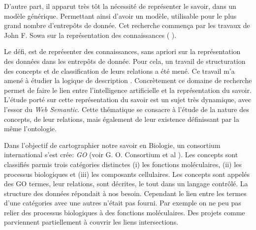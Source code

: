 \begin{refsection}

D'autre part, il apparut très tôt la nécessité de représenter le savoir, dans un modèle générique. Permettant ainsi d'avoir un modèle, utilisable pour le plus grand nombre d'entrepôts de donnée. Cet recherche  commença par les travaux de John F. Sowa sur la représentation des connaissances ( \citeyear{sowa92,sowa99}).

Le défi, est de représenter des connaissances, sans apriori sur la représentation des données dans les entrepôts de donnée. Pour cela, un travail de structuration des concepts et de classification de leurs relations a été mené. Ce travail m'a amené à étudier la logique de description \cite{baader2003description}. Concrètement ce domaine de recherche permet de faire le lien entre l'intelligence artificielle et la représentation du savoir. L'étude porté sur cette représentation du savoir est un sujet très dynamique, avec l'essor du \textit{Web Semantic}. Cette thématique se consacre à l'étude de la nature des concepts, de leur relations, mais également de leur existence définissant par la même l'ontologie.

Dans l'objectif de cartographier notre savoir en Biologie, un consortium international s'est crée: \textit{\gls{GO}} (voir G. O. Consortium
et al \citeyear{go2001,go2004}). Les concepts sont classifiés parmis trois catégories distinctes (i) les fonctions moléculaires, (ii) les processus biologiques et (iii) les composants cellulaires. Les concepts sont appelés des GO termes, leur relations, sont décrites, le tout dans un langage contrôlé. La structure des données répondait à nos besoin. Cependant le lien entre les termes d'une catégories avec une autres n'était pas fourni. Par exemple on ne peu pas relier des processus biologiques à des fonctions moléculaires. Des projets comme \cite{AdditionalGO2006} parviennent partiellement à couvrir les liens intersections.


\end{refsection}
